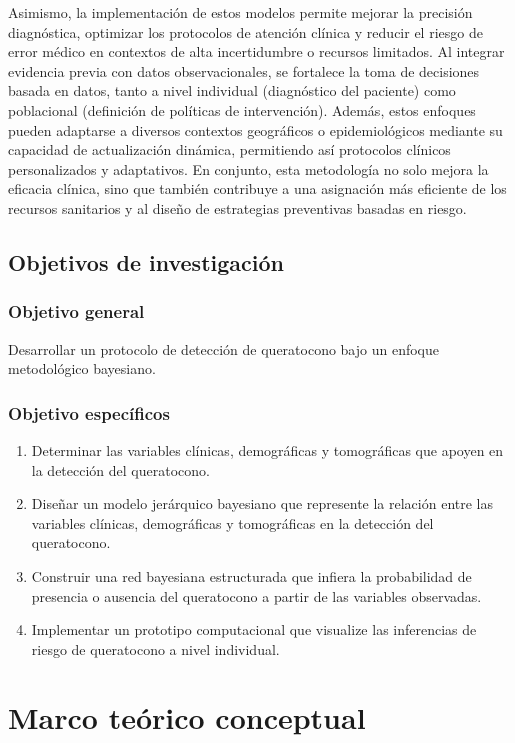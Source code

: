 Asimismo, la implementación de estos modelos permite mejorar la precisión diagnóstica, optimizar los protocolos de atención clínica y reducir el riesgo de error médico en contextos de alta incertidumbre o recursos limitados. Al integrar evidencia previa con datos observacionales, se fortalece la toma de decisiones basada en datos, tanto a nivel individual (diagnóstico del paciente) como poblacional (definición de políticas de intervención). Además, estos enfoques pueden adaptarse a diversos contextos geográficos o epidemiológicos mediante su capacidad de actualización dinámica, permitiendo así protocolos clínicos personalizados y adaptativos. En conjunto, esta metodología no solo mejora la eficacia clínica, sino que también contribuye a una asignación más eficiente de los recursos sanitarios y al diseño de estrategias preventivas basadas en riesgo.



\subsection{Objetivos de investigación}
\subsubsection{Objetivo general}
Desarrollar un protocolo de detección de queratocono bajo un enfoque metodológico bayesiano.

\subsubsection{Objetivo específicos}
\begin{enumerate}
\item Determinar las variables clínicas, demográficas y tomográficas que apoyen en la detección del queratocono.
\item Diseñar un modelo jerárquico bayesiano que represente la relación entre las variables clínicas, demográficas y tomográficas en la detección del queratocono.
\item Construir una red bayesiana estructurada que infiera la probabilidad de presencia o ausencia del queratocono a partir de las variables observadas.
\item Implementar un prototipo computacional que visualize las inferencias de riesgo de queratocono a nivel individual.
\end{enumerate}

\newpage
\section{Marco teórico conceptual}
